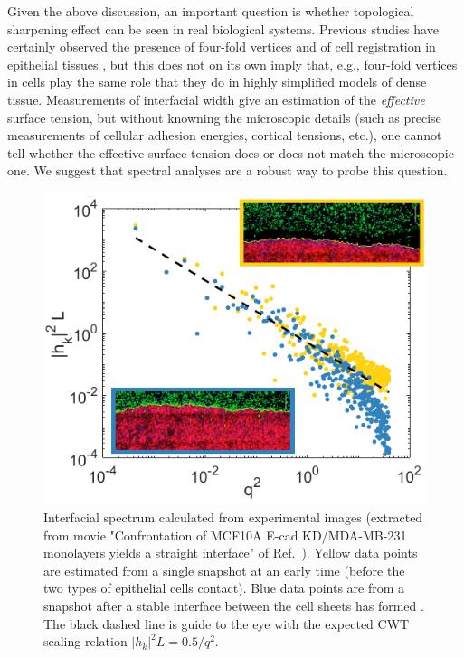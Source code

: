 \documentclass[twoside,twocolumn,9pt]{article}
\begin{document}
Given the above discussion, an important question is whether topological sharpening effect can be seen in real biological systems. Previous studies have certainly observed the presence of four-fold vertices and of cell registration in epithelial tissues \cite{jacinto2000dynamic,lawson2024differences}, but this does not on its own imply that, e.g., four-fold vertices in cells play the same role that they do in highly simplified models of dense tissue. Measurements of interfacial width give an estimation of the \emph{effective} surface tension, but without knowning the microscopic details (such as precise measurements of cellular adhesion energies, cortical tensions, etc.), one cannot tell whether the effective surface tension does or does not match the microscopic one. We suggest that spectral analyses are a robust way to probe this question. 

\begin{figure}[t]
    \centering
    \includegraphics[width=0.9\columnwidth]{Figure4.pdf}
    \caption{Interfacial spectrum calculated from experimental images (extracted from movie "Confrontation of MCF10A E-cad KD/MDA-MB-231 monolayers yields a straight interface" of Ref.~\cite{guan2023interfacial}). Yellow data points are estimated from a single snapshot at an early time (before the two types of epithelial cells contact). Blue data points are from a snapshot after a stable interface between the cell sheets has formed . The black dashed line is guide to the eye with the expected CWT scaling relation $|h_k|^2 L = 0.5/q^2$.} 
    \label{fig:exp}
\end{figure}
\end{document}
